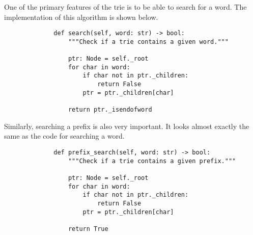 One of the primary features of the trie is to be able to search for a word.
The implementation of this algorithm is shown below.

\begin{figure}[H]
    \centering
    \begin{verbatim}
        def search(self, word: str) -> bool:
            """Check if a trie contains a given word."""

            ptr: Node = self._root
            for char in word:
                if char not in ptr._children:
                    return False
                ptr = ptr._children[char]

            return ptr._isendofword
    \end{verbatim}
\end{figure}

Similarly, searching a prefix is also very important. It looks almost exactly
the same as the code for searching a word.

\begin{figure}[H]
    \centering
    \begin{verbatim}
        def prefix_search(self, word: str) -> bool:
            """Check if a trie contains a given prefix."""

            ptr: Node = self._root
            for char in word:
                if char not in ptr._children:
                    return False
                ptr = ptr._children[char]

            return True
    \end{verbatim}
\end{figure}
